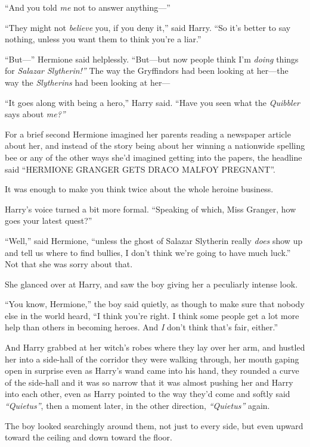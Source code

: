 ``And you told \emph{me} not to answer anything---''

``They might not \emph{believe} you, if you deny it,'' said Harry. ``So
it's better to say nothing, unless you want them to think you're a
liar.''

``But---'' Hermione said helplessly. ``But---but now people think I'm
\emph{doing} things for \emph{Salazar Slytherin!''} The way the
Gryffindors had been looking at her---the way the \emph{Slytherins} had
been looking at her---

``It goes along with being a hero,'' Harry said. ``Have you seen what
the \emph{Quibbler} says about \emph{me?''}

For a brief second Hermione imagined her parents reading a newspaper
article about her, and instead of the story being about her winning a
nationwide spelling bee or any of the other ways she'd imagined getting
into the papers, the headline said ``HERMIONE GRANGER GETS DRACO MALFOY
PREGNANT''.

It was enough to make you think twice about the whole heroine business.

Harry's voice turned a bit more formal. ``Speaking of which, Miss
Granger, how goes your latest quest?''

``Well,'' said Hermione, ``unless the ghost of Salazar Slytherin really
\emph{does} show up and tell us where to find bullies, I don't think
we're going to have much luck.'' Not that she was sorry about that.

She glanced over at Harry, and saw the boy giving her a peculiarly
intense look.

``You know, Hermione,'' the boy said quietly, as though to make sure
that nobody else in the world heard, ``I think you're right. I think
some people get a lot more help than others in becoming heroes. And
\emph{I} don't think that's fair, either.''

And Harry grabbed at her witch's robes where they lay over her arm, and
hustled her into a side-hall of the corridor they were walking through,
her mouth gaping open in surprise even as Harry's wand came into his
hand, they rounded a curve of the side-hall and it was so narrow that it
was almost pushing her and Harry into each other, even as Harry pointed
to the way they'd come and softly said \emph{``Quietus''}, then a moment
later, in the other direction, \emph{``Quietus''} again.

The boy looked searchingly around them, not just to every side, but even
upward toward the ceiling and down toward the floor.

